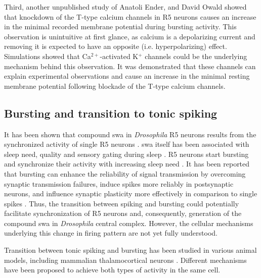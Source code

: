 \documentclass[../main.tex]{subfiles}
\begin{document}
Third, another unpublished study of Anatoli Ender, and David Owald showed that knockdown of the T-type calcium channels in R5 neurons causes an increase in the minimal recorded membrane potential during bursting activity. This observation is unintuitive at first glance, as calcium is a depolarizing current and removing it is expected to have an opposite (i.e. hyperpolarizing) effect.
Simulations showed that Ca$^{2+}$-activated K$^+$ channels could be the underlying mechanism behind this observation. It was demonstrated that these channels can explain experimental observations and cause an increase in the minimal resting membrane potential following blockade of the T-type calcium channels.


\subsection{Bursting and transition to tonic spiking}

It has been shown that compound \gls{swa} in \textit{Drosophila} R5 neurons results from the synchronized activity of single R5 neurons \parencite{raccugliaNetworkSpecificSynchronizationElectrical2019}. \gls{swa} itself has been associated with sleep need, quality and sensory gating during sleep \parencite{suarez-grimaltNeuralArchitectureSleep2021,raccugliaNetworkSpecificSynchronizationElectrical2019,gentThalamicDualControl2018}. R5 neurons start bursting and synchronize their activity with increasing sleep need \parencite{suarez-grimaltNeuralArchitectureSleep2021}. 
It has been reported that bursting can enhance the reliability of signal transmission by overcoming synaptic transmission failures, induce spikes more reliably in postsynaptic neurons, and influence synaptic plasticity more effectively in comparison to single spikes \parencite{lismanBurstsUnitNeural1997,kimBurstSynchronizationScalefree2019}.
Thus, the transition between spiking and bursting could potentially facilitate synchronization of R5 neurons and, consequently, generation of the compound \gls{swa} in \textit{Drosophila} central complex. However, the cellular mechanisms underlying this change in firing pattern are not yet fully understood.

Transition between tonic spiking and bursting has been studied in various animal models, including mammalian thalamocortical neurons \parencite{wangMultipleDynamicalModes1994,suzukiTtypeCalciumChannels1989,vickstromTTypeCalciumChannels2020,liuMultipleConductancesCooperatively2008,mccormickModelElectrophysiologicalProperties1992}. Different mechanisms have been proposed to achieve both types of activity in the same cell.
\end{document}
